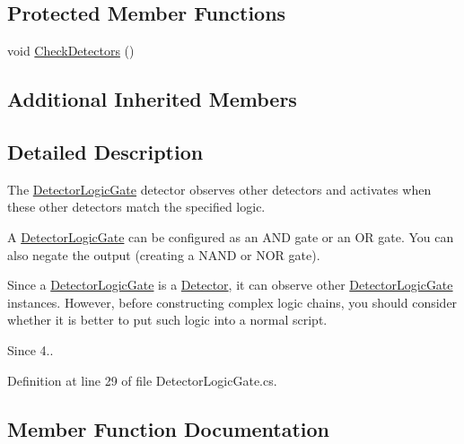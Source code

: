 \subsection*{Protected Member Functions}
\begin{DoxyCompactItemize}
\item 
void \mbox{\hyperlink{class_leap_1_1_unity_1_1_detector_logic_gate_ad2a29c15734f53978d2ba432cbcec9c1}{Check\+Detectors}} ()
\end{DoxyCompactItemize}
\subsection*{Additional Inherited Members}


\subsection{Detailed Description}
The \mbox{\hyperlink{class_leap_1_1_unity_1_1_detector_logic_gate}{Detector\+Logic\+Gate}} detector observes other detectors and activates when these other detectors match the specified logic.

A \mbox{\hyperlink{class_leap_1_1_unity_1_1_detector_logic_gate}{Detector\+Logic\+Gate}} can be configured as an A\+ND gate or an OR gate. You can also negate the output (creating a N\+A\+ND or N\+OR gate).

Since a \mbox{\hyperlink{class_leap_1_1_unity_1_1_detector_logic_gate}{Detector\+Logic\+Gate}} is a \mbox{\hyperlink{class_leap_1_1_unity_1_1_detector}{Detector}}, it can observe other \mbox{\hyperlink{class_leap_1_1_unity_1_1_detector_logic_gate}{Detector\+Logic\+Gate}} instances. However, before constructing complex logic chains, you should consider whether it is better to put such logic into a normal script.

\begin{DoxySince}{Since}
4.. 
\end{DoxySince}


Definition at line 29 of file Detector\+Logic\+Gate.\+cs.



\subsection{Member Function Documentation}
\mbox{\label{class_leap_1_1_unity_1_1_detector_logic_gate_a68c43209a42021b8b4e8d5cfecc29d5b}} 
